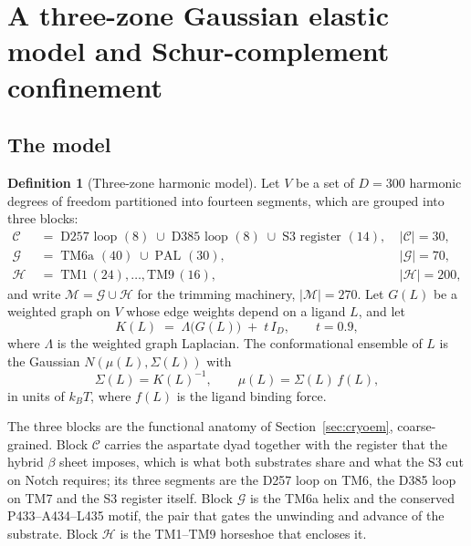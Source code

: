 \documentclass[11pt,reqno]{amsart}
\theoremstyle{plain}
\theoremstyle{definition}
\newtheorem{definition}[theorem]{Definition}
\theoremstyle{remark}
\numberwithin{equation}{section}
\newcommand{\CC}{\mathcal{C}}
\newcommand{\GG}{\mathcal{G}}
\newcommand{\HH}{\mathcal{H}}
\newcommand{\MM}{\mathcal{M}}
\newcommand{\kT}{k_{B}T}
\begin{document}
\section{A three-zone Gaussian elastic model and Schur-complement confinement}
\label{sec:model}

\subsection{The model}
\begin{definition}[Three-zone harmonic model]
\label{def:model}
Let $V$ be a set of $D=300$ harmonic degrees of freedom partitioned into fourteen segments, which are grouped into three blocks:
\begin{align*}
\CC \;&=\; \text{D257 loop }(8) \;\cup\; \text{D385 loop }(8) \;\cup\; \text{S3 register }(14), && |\CC|=30,\\
\GG \;&=\; \text{TM6a }(40) \;\cup\; \text{PAL }(30), && |\GG|=70,\\
\HH \;&=\; \text{TM1}\,(24),\dots,\text{TM9}\,(16), && |\HH|=200,
\end{align*}
and write $\MM=\GG\cup\HH$ for the trimming machinery, $|\MM|=270$. Let $G(L)$ be a weighted graph on $V$ whose edge weights depend on a ligand $L$, and let
\begin{equation}
\label{eq:K}
K(L) \;=\; \Lambda\bigl(G(L)\bigr) \;+\; t\,I_D,
\qquad t = 0.9,
\end{equation}
where $\Lambda$ is the weighted graph Laplacian. The conformational ensemble of $L$ is the Gaussian $N(\mu(L),\Sigma(L))$ with
\begin{equation}
\label{eq:ensemble}
\Sigma(L) = K(L)^{-1}, \qquad \mu(L) = \Sigma(L)\, f(L),
\end{equation}
in units of $\kT$, where $f(L)$ is the ligand binding force.
\end{definition}

The three blocks are the functional anatomy of Section~\ref{sec:cryoem}, coarse-grained. Block $\CC$ carries the aspartate dyad together with the register that the hybrid $\beta$ sheet imposes, which is what both substrates share and what the S3 cut on Notch requires; its three segments are the D257 loop on TM6, the D385 loop on TM7 and the S3 register itself. Block $\GG$ is the TM6a helix and the conserved P433--A434--L435 motif, the pair that gates the unwinding and advance of the substrate. Block $\HH$ is the TM1--TM9 horseshoe that encloses it.
\end{document}
